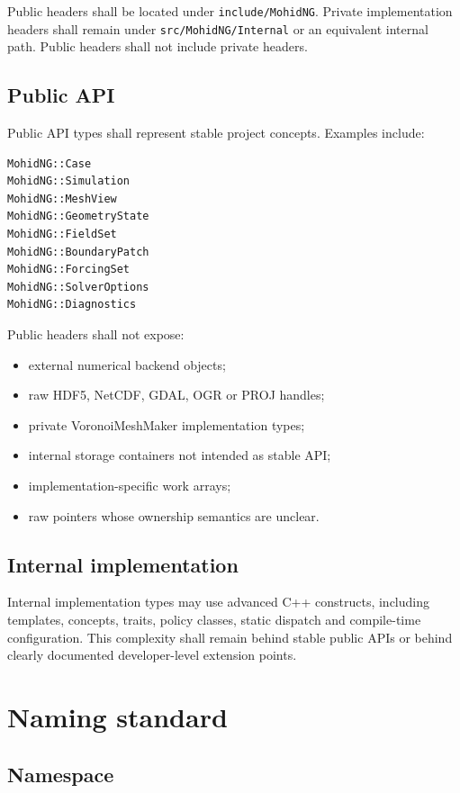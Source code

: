 \documentclass[11pt,a4paper]{article}
\newcommand{\code}[1]{\texttt{#1}}
\begin{document}
Public headers shall be located under \code{include/MohidNG}. Private implementation headers shall remain under \code{src/MohidNG/Internal} or an equivalent internal path. Public headers shall not include private headers.

\subsection{Public API}

Public API types shall represent stable project concepts. Examples include:

\begin{lstlisting}[style=mohidcpp]
MohidNG::Case
MohidNG::Simulation
MohidNG::MeshView
MohidNG::GeometryState
MohidNG::FieldSet
MohidNG::BoundaryPatch
MohidNG::ForcingSet
MohidNG::SolverOptions
MohidNG::Diagnostics
\end{lstlisting}

Public headers shall not expose:

\begin{itemize}
  \item external numerical backend objects;
  \item raw HDF5, NetCDF, GDAL, OGR or PROJ handles;
  \item private VoronoiMeshMaker implementation types;
  \item internal storage containers not intended as stable API;
  \item implementation-specific work arrays;
  \item raw pointers whose ownership semantics are unclear.
\end{itemize}

\subsection{Internal implementation}

Internal implementation types may use advanced C++ constructs, including templates, concepts, traits, policy classes, static dispatch and compile-time configuration. This complexity shall remain behind stable public APIs or behind clearly documented developer-level extension points.

\section{Naming standard}

\subsection{Namespace}
\end{document}
